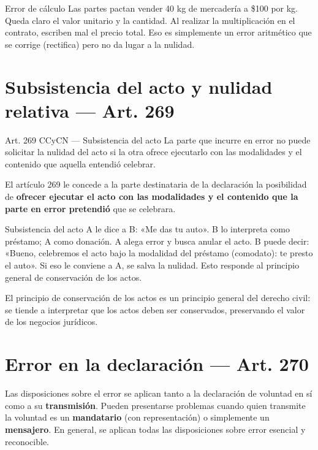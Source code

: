 \documentclass[12pt,oneside]{book}
\begin{document}
\begin{example}{Error de cálculo}
Las partes pactan vender 40 kg de mercadería a \$100 por kg. Queda claro el valor unitario y la cantidad. Al realizar la multiplicación en el contrato, escriben mal el precio total. Eso es simplemente un error aritmético que se corrige (rectifica) pero no da lugar a la nulidad.
\end{example}

\section{Subsistencia del acto y nulidad relativa --- Art. 269}

\begin{articulo}{Art. 269 CCyCN --- Subsistencia del acto}
La parte que incurre en error no puede solicitar la nulidad del acto si la otra ofrece ejecutarlo con las modalidades y el contenido que aquella entendió celebrar.
\end{articulo}

El artículo 269 le concede a la parte destinataria de la declaración la posibilidad de \textbf{ofrecer ejecutar el acto con las modalidades y el contenido que la parte en error pretendió} que se celebrara.

\begin{example}{Subsistencia del acto}
A le dice a B: «Me das tu auto». B lo interpreta como préstamo; A como donación. A alega error y busca anular el acto. B puede decir: «Bueno, celebremos el acto bajo la modalidad del préstamo (comodato): te presto el auto». Si eso le conviene a A, se salva la nulidad. Esto responde al principio general de conservación de los actos.
\end{example}

\begin{important}
El principio de conservación de los actos es un principio general del derecho civil: se tiende a interpretar que los actos deben ser conservados, preservando el valor de los negocios jurídicos.
\end{important}

\section{Error en la declaración --- Art. 270}

Las disposiciones sobre el error se aplican tanto a la declaración de voluntad en sí como a su \textbf{transmisión}. Pueden presentarse problemas cuando quien transmite la voluntad es un \textbf{mandatario} (con representación) o simplemente un \textbf{mensajero}. En general, se aplican todas las disposiciones sobre error esencial y reconocible.
\end{document}
